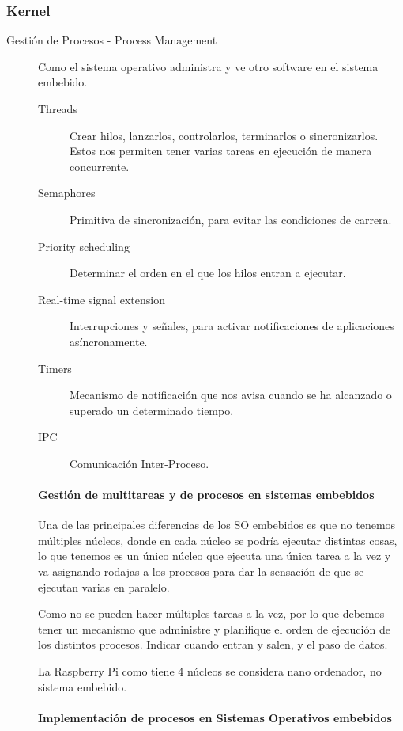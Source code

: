 \documentclass[12pt]{report} %
\begin{document}
\subsubsection{Kernel}

\begin{description}
	\item[Gestión de Procesos - Process Management] Como el sistema operativo administra y ve otro software en el sistema embebido. 

	\begin{description}
		\item[Threads] Crear hilos, lanzarlos, controlarlos, terminarlos o sincronizarlos. Estos nos permiten tener varias tareas en ejecución de manera concurrente. 
		\item[Semaphores] Primitiva de sincronización, para evitar las condiciones de carrera.
		\item[Priority scheduling] Determinar el orden en el que los hilos entran a ejecutar.
		\item[Real-time signal extension] Interrupciones y señales, para activar notificaciones de aplicaciones asíncronamente.
		\item[Timers] Mecanismo de notificación que nos avisa cuando se ha alcanzado o superado un determinado tiempo.
		\item[IPC] Comunicación Inter-Proceso.
	\end{description}

	\paragraph{Gestión de multitareas y de procesos en sistemas embebidos}

	Una de las principales diferencias de los SO embebidos es que no tenemos múltiples núcleos, donde en cada núcleo se podría ejecutar distintas cosas, lo que tenemos es un único núcleo que ejecuta una única tarea a la vez y va asignando rodajas a los procesos para dar la sensación de que se ejecutan varias en paralelo.

	Como no se pueden hacer múltiples tareas a la vez, por lo que debemos tener un mecanismo que administre y planifique el orden de ejecución de los distintos procesos. Indicar cuando entran y salen, y el paso de datos.
	
	La Raspberry Pi como tiene 4 núcleos se considera nano ordenador, no sistema embebido.
	
	
	\paragraph{Implementación de procesos en Sistemas Operativos embebidos}
	

\end{description}
\end{document}
